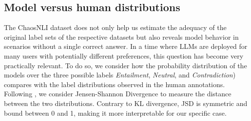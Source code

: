 \subsection{Model versus human distributions}\label{subsec:chaosnli_dist}
The ChaosNLI dataset does not only help us estimate the adequacy of the original label sets of the respective datasets but also reveals model behavior in scenarios without a single correct answer.
In a time where LLMs are deployed for many users with potentially different preferences, this question has become very practically relevant.
To do so, we consider how the probability distribution of the models over the three possible labels \textit{Entailment}, \textit{Neutral}, and \textit{Contradiction}) compares with the label distributions observed in the human annotations.
Following \citet{nie-etal-2020-learn}, we consider Jensen-Shannon Divergence \citep[JSD][]{menendez1997jensen} to measure the distance between the two distributions. 
%
%
Contrary to KL divergence, JSD is symmetric and bound between 0 and 1, making it more interpretable for our specific case.

